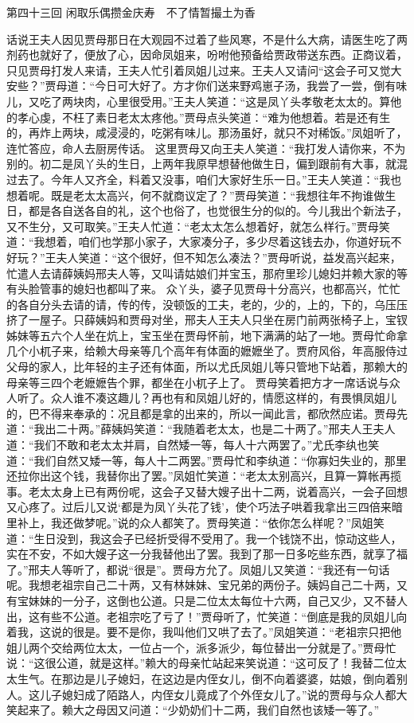 \documentclass[12pt,oneside]{book}
\begin{document}
 
第四十三回  闲取乐偶攒金庆寿　不了情暂撮土为香


话说王夫人因见贾母那日在大观园不过着了些风寒，不是什么大病，请医生吃了两剂药也就好了，便放了心，因命凤姐来，吩咐他预备给贾政带送东西。正商议着，只见贾母打发人来请，王夫人忙引着凤姐儿过来。王夫人又请问“这会子可又觉大安些？”贾母道：“今日可大好了。方才你们送来野鸡崽子汤，我尝了一尝，倒有味儿，又吃了两块肉，心里很受用。”王夫人笑道：“这是凤丫头孝敬老太太的。算他的孝心虔，不枉了素日老太太疼他。”贾母点头笑道：“难为他想着。若是还有生的，再炸上两块，咸浸浸的，吃粥有味儿。那汤虽好，就只不对稀饭。”凤姐听了，连忙答应，命人去厨房传话。
这里贾母又向王夫人笑道：“我打发人请你来，不为别的。初二是凤丫头的生日，上两年我原早想替他做生日，偏到跟前有大事，就混过去了。今年人又齐全，料着又没事，咱们大家好生乐一日。”王夫人笑道：“我也想着呢。既是老太太高兴，何不就商议定了？”贾母笑道：“我想往年不拘谁做生日，都是各自送各自的礼，这个也俗了，也觉很生分的似的。今儿我出个新法子，又不生分，又可取笑。”王夫人忙道：“老太太怎么想着好，就怎么样行。”贾母笑道：“我想着，咱们也学那小家子，大家凑分子，多少尽着这钱去办，你道好玩不好玩？”王夫人笑道：“这个很好，但不知怎么凑法？”贾母听说，益发高兴起来，忙遣人去请薛姨妈邢夫人等，又叫请姑娘们并宝玉，那府里珍儿媳妇并赖大家的等有头脸管事的媳妇也都叫了来。
众丫头，婆子见贾母十分高兴，也都高兴，忙忙的各自分头去请的请，传的传，没顿饭的工夫，老的，少的，上的，下的，乌压压挤了一屋子。只薛姨妈和贾母对坐，邢夫人王夫人只坐在房门前两张椅子上，宝钗姊妹等五六个人坐在炕上，宝玉坐在贾母怀前，地下满满的站了一地。贾母忙命拿几个小杌子来，给赖大母亲等几个高年有体面的嬷嬷坐了。贾府风俗，年高服侍过父母的家人，比年轻的主子还有体面，所以尤氏凤姐儿等只管地下站着，那赖大的母亲等三四个老嬷嬷告个罪，都坐在小杌子上了。
贾母笑着把方才一席话说与众人听了。众人谁不凑这趣儿？再也有和凤姐儿好的，情愿这样的，有畏惧凤姐儿的，巴不得来奉承的：况且都是拿的出来的，所以一闻此言，都欣然应诺。贾母先道：“我出二十两。”薛姨妈笑道：“我随着老太太，也是二十两了。”邢夫人王夫人道：“我们不敢和老太太并肩，自然矮一等，每人十六两罢了。”尤氏李纨也笑道：“我们自然又矮一等，每人十二两罢。”贾母忙和李纨道：“你寡妇失业的，那里还拉你出这个钱，我替你出了罢。”凤姐忙笑道：“老太太别高兴，且算一算帐再揽事。老太太身上已有两份呢，这会子又替大嫂子出十二两，说着高兴，一会子回想又心疼了。过后儿又说‘都是为凤丫头花了钱’，使个巧法子哄着我拿出三四倍来暗里补上，我还做梦呢。”说的众人都笑了。贾母笑道：“依你怎么样呢？”凤姐笑道：“生日没到，我这会子已经折受得不受用了。我一个钱饶不出，惊动这些人，实在不安，不如大嫂子这一分我替他出了罢。我到了那一日多吃些东西，就享了福了。”邢夫人等听了，都说“很是”。贾母方允了。凤姐儿又笑道：“我还有一句话呢。我想老祖宗自己二十两，又有林妹妹、宝兄弟的两份子。姨妈自己二十两，又有宝妹妹的一分子，这倒也公道。只是二位太太每位十六两，自己又少，又不替人出，这有些不公道。老祖宗吃了亏了！”贾母听了，忙笑道：“倒底是我的凤姐儿向着我，这说的很是。要不是你，我叫他们又哄了去了。”凤姐笑道：“老祖宗只把他姐儿两个交给两位太太，一位占一个，派多派少，每位替出一分就是了。”贾母忙说：“这很公道，就是这样。”赖大的母亲忙站起来笑说道：“这可反了！我替二位太太生气。在那边是儿子媳妇，在这边是内侄女儿，倒不向着婆婆，姑娘，倒向着别人。这儿子媳妇成了陌路人，内侄女儿竟成了个外侄女儿了。”说的贾母与众人都大笑起来了。赖大之母因又问道：“少奶奶们十二两，我们自然也该矮一等了。”
\end{document}
